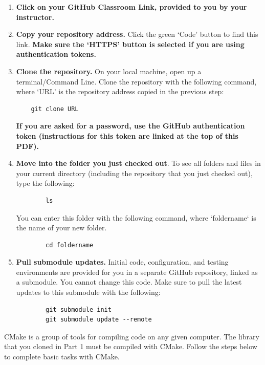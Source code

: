 \documentclass{article} %
\begin{document}
\begin{enumerate} 
    \item \textbf{Click on your GitHub Classroom Link, provided to you by your instructor.}
    
    \item \textbf{Copy your repository address.} Click the green `Code' button to find this link.  \textbf{Make sure the `HTTPS' button is selected if you are using authentication tokens.}    
    
    \item \textbf{Clone the repository.}  On your local machine, open up a terminal/Command Line.  Clone the repository with the following command, where `URL' is the repository address copied in the previous step:
    \begin{verbatim}
    git clone URL
    \end{verbatim}
    \textbf{If you are asked for a password, use the GitHub authentication token (instructions for this token are linked at the top of this PDF).}
    

    \item \textbf{Move into the folder you just checked out}.  To see all folders and files in your current directory (including the repository that you just checked out), type the following:
    \begin{verbatim}
        ls
    \end{verbatim}
    You can enter this folder with the following command, where `foldername` is the name of your new folder.
    \begin{verbatim}
        cd foldername
    \end{verbatim}
    
    \item \textbf{Pull submodule updates.}  Initial code, configuration, and testing environments are provided for you in a separate GitHub repository, linked as a submodule.  You cannot change this code.  Make sure to pull the latest updates to this submodule with the following:
    \begin{verbatim}
        git submodule init
        git submodule update --remote
    \end{verbatim}
\end{enumerate}

CMake is a group of tools for compiling code on any given computer.  The library that you cloned in Part 1 must be compiled with CMake.  Follow the steps below to complete basic tasks with CMake.
\end{document}
